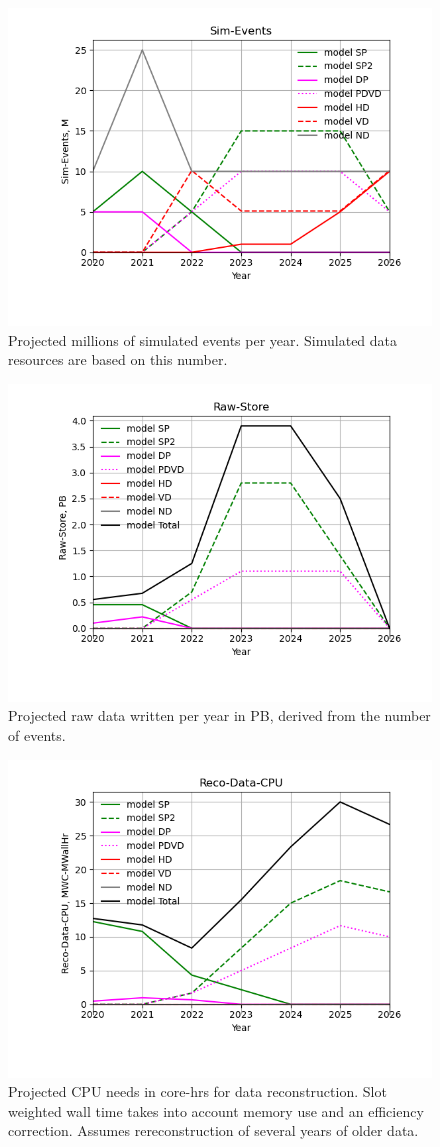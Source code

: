 \begin{figure}[h]
\centering\includegraphics[height=0.4\textwidth]{MoreSim_2022-12-04-2026/MoreSim_2022-12-04-2026-Sim-Events.png}
\caption{Projected millions of simulated events per year. Simulated data resources are based on this number. }
\label{fig:Sim-Events}
\end{figure}
\begin{figure}[h]
\centering\includegraphics[height=0.4\textwidth]{MoreSim_2022-12-04-2026/MoreSim_2022-12-04-2026-Raw-Store.png}
\caption{Projected raw data written per year in PB, derived from the number of events.}
\label{fig:Raw-Store}
\end{figure}
\begin{figure}[h]
\centering\includegraphics[height=0.4\textwidth]{MoreSim_2022-12-04-2026/MoreSim_2022-12-04-2026-Reco-Data-CPU.png}
\caption{Projected CPU needs in core-hrs for data reconstruction.              Slot weighted wall time takes into account memory use and an efficiency correction.  Assumes rereconstruction of several years of older data.}
\label{fig:Reco-Data-CPU}
\end{figure}
